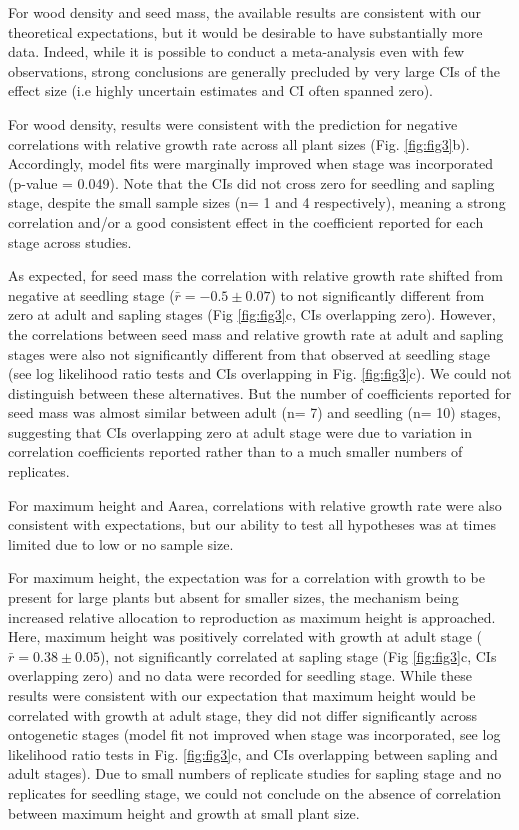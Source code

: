\documentclass[a4paper,11pt]{article}
\begin{document}
For wood density and seed mass, the available results are consistent with our theoretical expectations, but it would be desirable to have substantially more data. Indeed, while it is possible to conduct a meta-analysis even with few observations, strong conclusions are generally precluded by very large CIs of the effect size (i.e highly uncertain estimates and CI often spanned zero).

For wood density, results were consistent with the prediction for negative correlations with relative growth rate across all plant sizes (Fig. \ref{fig:fig3}b). Accordingly, model fits were marginally improved when stage was incorporated (p-value = 0.049). Note that the CIs did not cross zero for seedling and sapling stage, despite the small sample sizes (n= 1 and 4 respectively), meaning a strong correlation and/or a good consistent effect in the coefficient reported for each stage across studies.

As expected, for seed mass the correlation with relative growth rate shifted from negative at seedling stage ($\bar{r}= -0.5 \pm 0.07$) to not significantly different from zero at adult and sapling stages (Fig \ref{fig:fig3}c, CIs overlapping zero). However, the correlations between seed mass and relative growth rate at adult and sapling stages were also not significantly different from that observed at seedling stage (see log likelihood ratio tests and CIs overlapping in Fig. \ref{fig:fig3}c). We could not distinguish between these alternatives. But the number of coefficients reported for seed mass was almost similar between adult (n= 7) and seedling (n= 10) stages, suggesting that CIs overlapping zero at adult stage were due to variation in correlation coefficients reported rather than to a much smaller numbers of replicates.

For maximum height and Aarea, correlations with relative growth rate were also consistent with expectations, but our ability to test all hypotheses was at times limited due to low or no sample size.

For maximum height, the expectation was for a correlation with growth to be present for large plants but absent for smaller sizes, the mechanism being increased relative allocation to reproduction as maximum height is approached. Here, maximum height was positively correlated with growth at adult stage ($\bar{r}= 0.38 \pm 0.05$), not significantly correlated at sapling stage (Fig \ref{fig:fig3}c, CIs overlapping zero) and no data were recorded for seedling stage. While these results were consistent with our expectation that maximum height would be correlated with growth at adult stage, they did not differ significantly across ontogenetic stages (model fit not improved when stage was incorporated, see log likelihood ratio tests in Fig. \ref{fig:fig3}c, and CIs overlapping between sapling and adult stages). Due to small numbers of replicate studies for sapling stage and no replicates for seedling stage, we could not conclude on the absence of correlation between maximum height and growth at small plant size.
\end{document}
